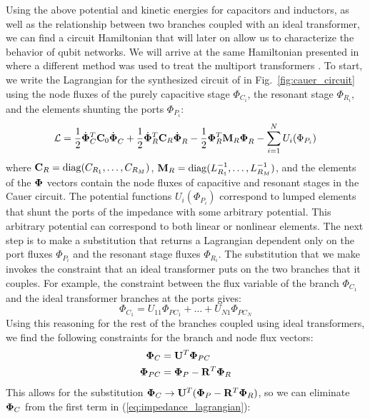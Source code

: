 Using the above potential and kinetic energies for capacitors and inductors, as well as the relationship between two branches coupled with an ideal transformer, we can find a circuit Hamiltonian that will later on allow us to characterize the behavior of qubit networks. We will arrive at the same Hamiltonian presented in \cite{solgun_sirf} where a different method was used to treat the multiport transformers \cite{burkard_circuit_2005,multiport_impedance_quantization}. To start, we write the Lagrangian for the synthesized circuit of in Fig.\ \ref{fig:cauer_circuit} using the node fluxes of the purely capacitive stage $\Phi_{C_i}$, the resonant stage $\Phi_{R_i}$, and the elements shunting the ports $\Phi_{P_i}$:
\begin{equation}\label{eq:impedance_lagrangian}
    \mathcal{L} = \frac{1}{2}\dot{\vb{\Phi}}_C^T \vb{C}_0 \dot{\vb{\Phi}}_C^{\phantom{^T}} + \frac{1}{2}\dot{\vb{\Phi}}_R^T \vb{C}_R \dot{\vb{\Phi}}_R^{\phantom{^T}} - \frac{1}{2}\vb{\Phi}_R^T \vb{M}_R \vb{\Phi}_R^{\phantom{^T}} - \sum_{i=1}^N U_i(\Phi_{P_i})
\end{equation}
where $\vb{C}_R = \operatorname{diag}(C_{R_1}, \dots, C_{R_M})$, $\vb{M}_R = \operatorname{diag}(L_{R_1}^{-1}, \dots, L_{R_M}^{-1})$, and the elements of the $\vb{\Phi}$ vectors contain the node fluxes of capacitive and resonant stages in the Cauer circuit. The potential functions $U_i(\Phi_{P_i})$ correspond to lumped elements that shunt the ports of the impedance with some arbitrary potential. This arbitrary potential can correspond to both linear or nonlinear elements. The next step is to make a substitution that returns a Lagrangian dependent only on the port fluxes $\Phi_{P_i}$ and the resonant stage fluxes $\Phi_{R_i}$. The substitution that we make invokes the constraint that an ideal transformer puts on the two branches that it couples. For example, the constraint between the flux variable of the branch $\Phi_{C_1}$ and the ideal transformer branches at the ports gives:
\begin{equation}
    \Phi_{C_1} = U_{11}\Phi_{PC_1} + \dots + U_{N1}\Phi_{PC_N}
\end{equation}
Using this reasoning for the rest of the branches coupled using ideal transformers, we find the following constraints for the branch and node flux vectors:
\begin{align}
    \vb{\Phi}_C &= \vb{U}^T \vb{\Phi}_{PC} \\
    \vb{\Phi}_{PC} &= \vb{\Phi}_P - \vb{R}^T \vb{\Phi}_R
\end{align}
This allows for the substitution $\vb{\Phi}_C \rightarrow \vb{U}^T (\vb{\Phi}_P - \vb{R}^T\vb{\Phi}_R)$, so we can eliminate $\vb{\Phi}_C$ from the first term in (\ref{eq:impedance_lagrangian}):
